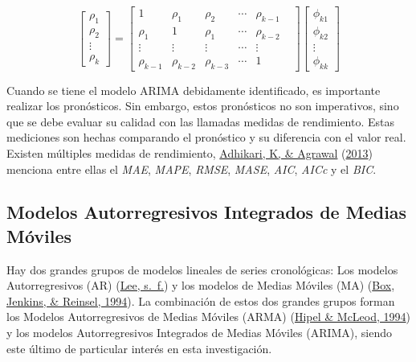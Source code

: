 \documentclass[
]{article}
\begin{document}
\begin{equation}
\label{eqn:sistema_yule_walker_matricial}
\left[ \begin{array}{c} \rho_1 \\ \rho_2 \\ \vdots \\ \rho_k \end{array} \right] = \begin{bmatrix} 1 & \rho_1 & \rho_2 & \cdots & \rho_{k-1} \\ \rho_1 & 1 & \rho_1 & \cdots & \rho_{k-2} \\ \vdots & \vdots & \vdots & \cdots & \vdots \\ \rho_{k-1} & \rho_{k-2} & \rho_{k-3} & \cdots & 1 &\end{bmatrix} \left[ \begin{array}{c} \phi_{k1} \\ \phi_{k2}  \\ \vdots \\ \phi_{kk} \end{array} \right]\end{equation}

Cuando se tiene el modelo ARIMA debidamente identificado, es importante
realizar los pronósticos. Sin embargo, estos pronósticos no son
imperativos, sino que se debe evaluar su calidad con las llamadas
medidas de rendimiento. Estas mediciones son hechas comparando el
pronóstico y su diferencia con el valor real. Existen múltiples medidas
de rendimiento, \protect\hyperlink{ref-medidas}{Adhikari, K, \& Agrawal}
(\protect\hyperlink{ref-medidas}{2013}) menciona entre ellas el
\emph{MAE}, \emph{MAPE}, \emph{RMSE}, \emph{MASE}, \emph{AIC},
\emph{AICc} y el \emph{BIC}.

\subsection{Modelos Autorregresivos Integrados de Medias Móviles}

Hay dos grandes grupos de modelos lineales de series cronológicas: Los
modelos Autorregresivos (AR) (\protect\hyperlink{ref-Lee}{Lee, s.~f.}) y
los modelos de Medias Móviles (MA)
(\protect\hyperlink{ref-box-jenkins}{Box, Jenkins, \& Reinsel, 1994}).
La combinación de estos dos grandes grupos forman los Modelos
Autorregresivos de Medias Móviles (ARMA)
(\protect\hyperlink{ref-Hipel}{Hipel \& McLeod, 1994}) y los modelos
Autorregresivos Integrados de Medias Móviles (ARIMA), siendo este último
de particular interés en esta investigación.
\end{document}
